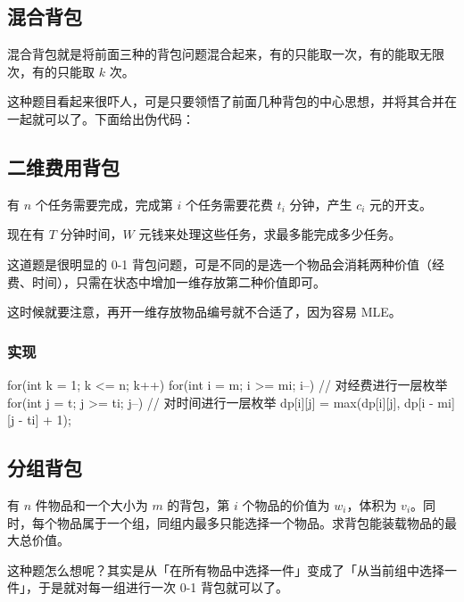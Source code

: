\subsection{混合背包}\label{ux6df7ux5408ux80ccux5305}

混合背包就是将前面三种的背包问题混合起来，有的只能取一次，有的能取无限次，有的只能取 \(k\) 次。

这种题目看起来很吓人，可是只要领悟了前面几种背包的中心思想，并将其合并在一起就可以了。下面给出伪代码：



\subsection{二维费用背包}\label{ux4e8cux7ef4ux8d39ux7528ux80ccux5305}

有 \(n\) 个任务需要完成，完成第 \(i\) 个任务需要花费 \(t_i\) 分钟，产生 \(c_i\) 元的开支。

现在有 \(T\) 分钟时间，\(W\) 元钱来处理这些任务，求最多能完成多少任务。

这道题是很明显的 0-1 背包问题，可是不同的是选一个物品会消耗两种价值（经费、时间），只需在状态中增加一维存放第二种价值即可。

这时候就要注意，再开一维存放物品编号就不合适了，因为容易 MLE。

\subsubsection{实现}\label{ux5b9eux73b0-2}


\begin{codeline}
for(int k = 1; k <= n; k++) {
    for(int i = m; i >= mi; i--) {     // 对经费进行一层枚举
        for(int j = t; j >= ti; j--) { // 对时间进行一层枚举
            dp[i][j] = max(dp[i][j], dp[i - mi][j - ti] + 1);
        }
    }
}
\end{codeline}


\subsection{分组背包}\label{ux5206ux7ec4ux80ccux5305}

有 \(n\) 件物品和一个大小为 \(m\) 的背包，第 \(i\) 个物品的价值为 \(w_i\)，体积为 \(v_i\)。同时，每个物品属于一个组，同组内最多只能选择一个物品。求背包能装载物品的最大总价值。

这种题怎么想呢？其实是从「在所有物品中选择一件」变成了「从当前组中选择一件」，于是就对每一组进行一次 0-1 背包就可以了。

